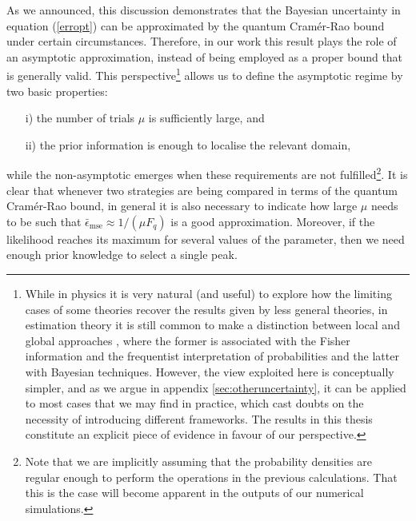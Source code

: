 As we announced, this discussion demonstrates that the Bayesian uncertainty in equation (\ref{erropt}) can be approximated by the quantum Cram\'{e}r-Rao bound under certain circumstances. Therefore, in our work this result plays the role of an asymptotic approximation, instead of being employed as a proper bound that is generally valid. This perspective\footnote{While in physics it is very natural (and useful) to explore how the limiting cases of some theories recover the results given by less general theories, in estimation theory it is still common to make a distinction between local and global approaches \cite{paris2009, rafal2015, li2018}, where the former is associated with the Fisher information and the frequentist interpretation of probabilities and the latter with Bayesian techniques. However, the view exploited here is conceptually simpler, and as we argue in appendix \ref{sec:otheruncertainty}, it can be applied to most cases that we may find in practice, which cast doubts on the necessity of introducing different frameworks. The results in this thesis constitute an explicit piece of evidence in favour of our perspective.} allows us to define the asymptotic regime by two basic properties:
\begin{itemize}
\item[i)] the number of trials $\mu$ is sufficiently large, and
\item[ii)] the prior information is enough to localise the relevant domain,
\end{itemize}
while the non-asymptotic emerges when these requirements are not fulfilled\footnote{Note that we are implicitly assuming that the probability densities are regular enough to perform the operations in the previous calculations. That this is the case will become apparent in the outputs of our numerical simulations.}. It is clear that whenever two strategies are being compared in terms of the quantum Cram\'{e}r-Rao bound, in general it is also necessary to indicate how large $\mu$ needs to be such that $\bar{\epsilon}_{\mathrm{mse}} \approx 1/(\mu F_q)$ is a good approximation. Moreover, if the likelihood reaches its maximum for several values of the parameter, then we need enough prior knowledge to select a single peak. 

